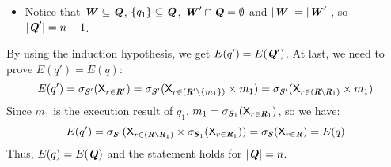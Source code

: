 \begin{Proof}
\begin{itemize}[leftmargin = 15pt]
            \item Notice that $\textbf{\textit{W}} \subseteq \textbf{\textit{Q}}$, $\{q_1\} \subseteq \textbf{\textit{Q}}$, $\textbf{\textit{W}}' \cap \textbf{\textit{Q}}=\emptyset$ and $|\textbf{\textit{W}}|=|\textbf{\textit{W}}'|$, so $|\textbf{\textit{Q}}'|=n-1$.
        \end{itemize}\par
        \indent By using the induction hypothesis, we get $E(q')=E(\textbf{\textit{Q}}')$.\newline
        \indent At last, we need to prove $E(q')=E(q)$:
        $$E(q')=\sigma_{\textbf{\textit{S}}'}(\mathsf{X}_{r \in \textbf{\textit{R}}'})=\sigma_{\textbf{\textit{S}}'}(\mathsf{X}_{r \in (\textbf{\textit{R}}' \setminus \{m_1\})} \times m_1)=\sigma_{\textbf{\textit{S}}'}(\mathsf{X}_{r \in (\textbf{\textit{R}} \setminus \textbf{\textit{R}}_1)} \times m_1)$$
        \indent Since $m_1$ is the execution result of $q_1$, $m_1=\sigma_{\textbf{\textit{S}}_1}(\mathsf{X}_{r \in \textbf{\textit{R}}_1})$, so we have:
        $$E(q')=\sigma_{\textbf{\textit{S}}'}(\mathsf{X}_{r \in (\textbf{\textit{R}} \setminus \textbf{\textit{R}}_1)} \times \sigma_{\textbf{\textit{S}}_1}(\mathsf{X}_{r \in \textbf{\textit{R}}_1}))=\sigma_{\textbf{\textit{S}}}(\mathsf{X}_{r \in \textbf{\textit{R}}})=E(q)$$
        \indent Thus, $E(q)=E(\textbf{\textit{Q}})$ and the statement holds for $|\textbf{\textit{Q}}|=n$.
    \end{Proof}